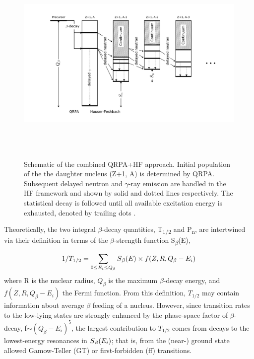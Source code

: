 \documentclass[a4paper,12pt,twoside]{report}
\begin{document}
 
\begin{figure}[h]
\centering
\includegraphics[width=17cm, height=10cm]{delayed_netron_emission_cascaade.png}
\caption[Schematic of the combined QRPA+HF approach]{Schematic of the combined QRPA+HF approach. Initial population of the the daughter nucleus (Z+1, A) is determined by QRPA. Subsequent delayed neutron and $\gamma$-ray emission are handled in the HF framework and shown by solid and dotted lines respectively. The statistical decay is followed until all available excitation energy is exhausted, denoted by trailing dots \cite{moller2016}. }
\end{figure}

Theoretically, the two integral $\beta$-decay quantities, T\textsubscript{1/2} and P\textsubscript{n}, are intertwined via their definition in terms of the $\beta$-strength function S\textsubscript{$\beta$}(E),

\begin{equation}
    1/T_{1/2}=\sum_{0\leq E_{i}\leq Q_{\beta}}S\textsubscript{$\beta$}(E)  \times f(Z,R,Q_{\beta}-E_{i})
\end{equation}
 where R is the nuclear radius, $Q_{\beta}$ is the maximum $\beta$-decay energy, and $f(Z,R,Q_{\beta}-E_{i})$ the Fermi function. From this definition, $T_{1/2}$ may contain information about average $\beta$ feeding of a nucleus. However, since transition rates to the low-lying states are strongly enhanced by the phase-space factor of $\beta$-decay, f$\sim (Q_{\beta}- E_{i})^5$, the largest contribution to $T_{1/2}$ comes from decays to the lowest-energy resonances in $S\textsubscript{$\beta$}(E_{i})$; that is, from the (near-) ground state allowed Gamow-Teller (GT) or first-forbidden (ff) transitions.
 
\end{document}
